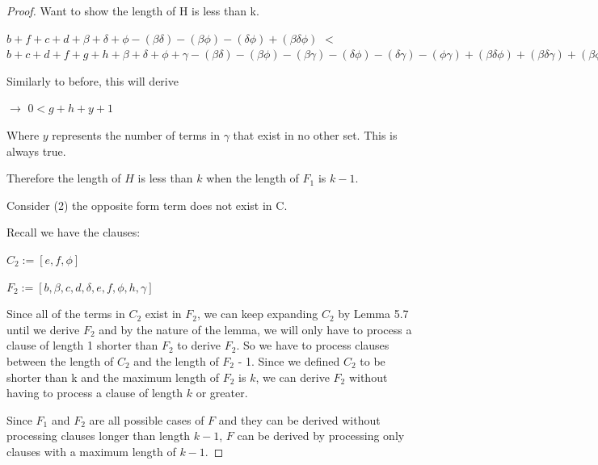 \documentclass[manuscript]{acmart}
\begin{document}
\begin{proof}
        Want to show the length of H is less than k.

        $b + f + c + d 
        + \beta + \delta + \phi
        - (\beta \delta) - (\beta \phi) - (\delta \phi)
        + (\beta \delta \phi) $
        $<$
        $b + c + d + f + g + h 
        + \beta + \delta + \phi + \gamma
        - (\beta \delta) - (\beta \phi) - (\beta \gamma) - (\delta \phi) - (\delta \gamma) - (\phi \gamma)
        + (\beta \delta \phi) + (\beta \delta \gamma) + (\beta \phi \gamma) + (\delta \phi \gamma)
        - (\beta \delta \phi \gamma)
        + 1
        $

        Similarly to before, this will derive 

        $\rightarrow$
        $0 < g + h + y + 1$

        Where $y$ represents the number of terms in $\gamma$ that exist in no other set. This is always true.
        
        Therefore the length of $H$ is less than $k$ when the length of $F_1$ is $k - 1$.

        Consider (2) the opposite form term does not exist in C.

        Recall we have the clauses:

        $C_2 := [e, f, \phi]$

        $F_2 := [b, \beta, c, d, \delta, e, f, \phi, h, \gamma]$

        Since all of the terms in $C_2$ exist in $F_2$, we can keep expanding $C_2$ by Lemma 5.7 until we derive $F_2$ and by the nature of the lemma, we will only have to process a clause of length 1 shorter than $F_2$ to derive $F_2$. So we have to process clauses between the length of $C_2$ and the length of $F_2$ - 1. Since we defined $C_2$ to be shorter than k and the maximum length of $F_2$ is $k$, we can derive $F_2$ without having to process a clause of length $k$ or greater.

        Since $F_1$ and $F_2$ are all possible cases of $F$ and they 
        can be derived without processing clauses longer than length
        $k-1$, $F$ can be derived by processing only clauses with
        a maximum length of $k-1$.
    \end{proof}
\end{document}
